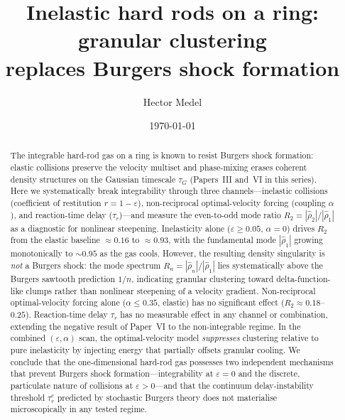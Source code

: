\documentclass[aps,pre,twocolumn,superscriptaddress,longbibliography,floatfix]{revtex4-2}
\begin{document}
\title{Inelastic hard rods on a ring: granular clustering\\
replaces Burgers shock formation}

\author{Hector Medel}

\date{\today}

\begin{abstract}
The integrable hard-rod gas on a ring is known to resist Burgers
shock formation: elastic collisions preserve the velocity multiset
and phase-mixing erases coherent density structures on the
Gaussian timescale $\tau_G$ (Papers~III
and~VI in this series). Here we systematically break
integrability through three channels---inelastic collisions
(coefficient of restitution $r = 1 - \varepsilon$), non-reciprocal
optimal-velocity forcing (coupling $\alpha$), and reaction-time
delay ($\tau_r$)---and measure the even-to-odd mode ratio
$R_2 = |\hat\rho_2|/|\hat\rho_1|$ as a diagnostic for nonlinear
steepening. Inelasticity alone ($\varepsilon \geq 0.05$, $\alpha =
0$) drives $R_2$ from the elastic baseline $\approx 0.16$ to
$\approx 0.93$, with the fundamental mode $|\hat\rho_1|$ growing
monotonically to $\sim 0.95$ as the gas cools. However, the
resulting density singularity is \emph{not} a Burgers shock: the
mode spectrum $R_n = |\hat\rho_n|/|\hat\rho_1|$ lies
systematically above the Burgers sawtooth prediction $1/n$,
indicating granular clustering toward delta-function-like clumps
rather than nonlinear steepening of a velocity gradient.
Non-reciprocal optimal-velocity forcing alone ($\alpha \leq 0.35$,
elastic) has no significant effect ($R_2 \approx 0.18$--$0.25$).
Reaction-time delay $\tau_r$ has no measurable effect in any
channel or combination, extending the negative result of Paper~VI
to the non-integrable regime. In the combined
$(\varepsilon, \alpha)$ scan, the optimal-velocity model
\emph{suppresses} clustering relative to pure inelasticity by
injecting energy that partially offsets granular cooling. We
conclude that the one-dimensional hard-rod gas possesses two
independent mechanisms that prevent Burgers shock
formation---integrability at $\varepsilon = 0$ and the discrete,
particulate nature of collisions at $\varepsilon > 0$---and that
the continuum delay-instability threshold $\tau_r^c$ predicted by
stochastic Burgers theory does not materialise microscopically in
any tested regime.
\end{abstract}

\maketitle
\end{document}
